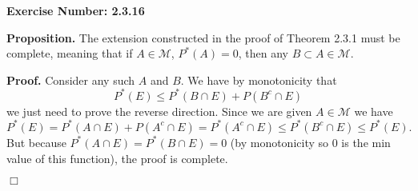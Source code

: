 \documentclass{article}
\begin{document}
\noindent \textbf{Exercise Number: 2.3.16}  %

\medskip 

\noindent \textbf{Proposition.} The extension constructed in the proof of Theorem 2.3.1 must be complete, meaning that if $A \in \mathcal{M}$, $P^*(A) = 0$, then any $B \subset A \in \mathcal{M}$. 

\bigskip

\noindent \textbf{Proof.} Consider any such $A$ and $B$. We have by monotonicity that \[P^*(E) \leq P^*(B \cap E) + P(B^c \cap E)\] we just need to prove the reverse direction. Since we are given $A \in \mathcal{M}$ we have \[P^*(E) = P^*(A \cap E) + P(A^c \cap E) = P^*(A^c \cap E) \leq P^*(B^c \cap E) \leq P^*(E). \] But because $P^*(A \cap E) = P^*(B \cap E) = 0$ (by monotonicity so 0 is the min value of this function), the proof is complete. 

\hfill $\Box$
\end{document}
